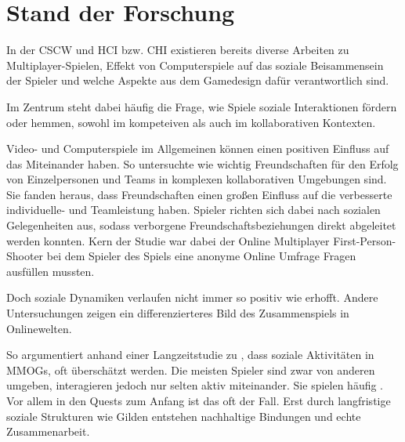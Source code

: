 \chapter{Stand der Forschung}


In der \ac{CSCW} und \ac{HCI} bzw. \ac{CHI} existieren bereits diverse Arbeiten zu Multiplayer-Spielen, Effekt von Computerspiele auf das soziale Beisammensein der Spieler und welche Aspekte aus dem Gamedesign dafür verantwortlich sind.

Im Zentrum steht dabei häufig die Frage, wie Spiele soziale Interaktionen fördern oder hemmen, sowohl im kompeteiven als auch im kollaborativen Kontexten.

Video- und Computerspiele im Allgemeinen können einen positiven Einfluss auf das Miteinander haben. So untersuchte \cite{mason_friends_2013} wie wichtig Freundschaften für den Erfolg von Einzelpersonen und Teams in komplexen kollaborativen Umgebungen sind. Sie fanden heraus, dass Freundschaften einen großen Einfluss auf die verbesserte individuelle- und Teamleistung haben. Spieler richten sich dabei nach sozialen Gelegenheiten aus, sodass verborgene Freundschaftsbeziehungen direkt abgeleitet werden konnten. Kern der Studie war dabei der Online Multiplayer First-Person-Shooter  bei dem Spieler des Spiels eine anonyme Online Umfrage Fragen ausfüllen mussten. 

Doch soziale Dynamiken verlaufen nicht immer so positiv wie erhofft. Andere Untersuchungen zeigen ein differenzierteres Bild des Zusammenspiels in Onlinewelten.

So argumentiert \cite{ducheneaut_alone_2006} anhand einer Langzeitstudie zu , dass soziale Aktivitäten in \ac{MMOG}s, oft überschätzt werden. Die meisten Spieler sind zwar von anderen umgeben, interagieren jedoch nur selten aktiv miteinander. Sie spielen häufig . Vor allem in den Quests zum Anfang ist das oft der Fall. Erst durch langfristige soziale Strukturen wie Gilden entstehen nachhaltige Bindungen und echte Zusammenarbeit.

